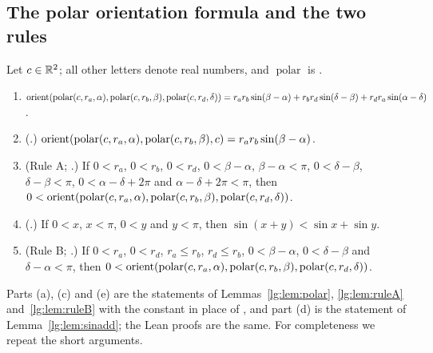 \subsection{The polar orientation formula and the two rules}

\begin{lemma}\label{pc:lem:polar-facts}
Let $c\in\mathbb R^2$; all other letters denote real numbers, and $\operatorname{polar}$ is
.
\begin{enumerate}[label=(\alph*)]
\item $\operatorname{orient}(\operatorname{polar}(c,r_a,\alpha),\operatorname{polar}(c,r_b,\beta),\operatorname{polar}(c,r_d,\delta))
  =r_ar_b\sin(\beta-\alpha)+r_br_d\sin(\delta-\beta)+r_dr_a\sin(\alpha-\delta)$.
\item \textup{(.)}
  $\operatorname{orient}(\operatorname{polar}(c,r_a,\alpha),\operatorname{polar}(c,r_b,\beta),c)=r_ar_b\sin(\beta-\alpha)$.
\item \textup{(Rule A; .)}
  If $0<r_a$, $0<r_b$, $0<r_d$, $0<\beta-\alpha$, $\beta-\alpha<\pi$, $0<\delta-\beta$,
  $\delta-\beta<\pi$, $0<\alpha-\delta+2\pi$ and $\alpha-\delta+2\pi<\pi$, then
  $0<\operatorname{orient}(\operatorname{polar}(c,r_a,\alpha),\operatorname{polar}(c,r_b,\beta),\operatorname{polar}(c,r_d,\delta))$.
\item \textup{(.)}
  If $0<x$, $x<\pi$, $0<y$ and $y<\pi$, then $\sin(x+y)<\sin x+\sin y$.
\item \textup{(Rule B; .)}
  If $0<r_a$, $0<r_d$, $r_a\le r_b$, $r_d\le r_b$, $0<\beta-\alpha$, $0<\delta-\beta$ and
  $\delta-\alpha<\pi$, then
  $0<\operatorname{orient}(\operatorname{polar}(c,r_a,\alpha),\operatorname{polar}(c,r_b,\beta),\operatorname{polar}(c,r_d,\delta))$.
\end{enumerate}
\end{lemma}

Parts (a), (c) and (e) are the statements of Lemmas~\ref{lg:lem:polar}, \ref{lg:lem:ruleA}
and~\ref{lg:lem:ruleB} with the constant  in place of , and
part (d) is the statement of Lemma~\ref{lg:lem:sinadd}; the Lean proofs are the same. For completeness we repeat
the short arguments.

